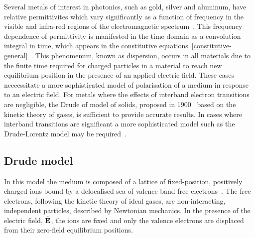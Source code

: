 Several metals of interest in photonics, such as gold, silver and aluminum, have relative permittivites which vary significantly as a function of frequency in the visible and infra-red regions of the electromagnetic spectrum~\cite{Ordal:1983bg}.
This frequency dependence of permittivity is manifested in the time domain as a convolution integral in time, which appears in the constitutive equations~\eqref{constitutive-general}~\cite{Jackson:490457}.
This phenomenum, known as dispersion, occurs in all materials due to the finite time required for charged particles in a material to reach new equilibrium position in the presence of an applied electric field.
These cases neccessitate a more sophisticated model of polarisation of a medium in response to an electric field. For metals where the effects of interband electron transitions are negligible, the Drude of model of solids, proposed in 1900~\cite{Drude:1900hg} based on the kinetic theory of gases, is sufficient to provide accurate results. In cases where interband transitions are significant a more sophisticated model such as the Drude-Lorentz model may be required~\cite{Fox:2001wm,Taflove:1989ds}.

\subsection{Drude model}
\label{sub:The Drude Model}

In this model the medium is composed of a lattice of fixed-position, positively charged ions bound by a delocalised sea of valence band free electrons~\cite{Ashcroft:2005wp,Bandyopadhyay:1503732}. The free electrons, following the kinetic theory of ideal gases, are non-interacting, independent particles, described by Newtonian mechanics. In the presence of the electric field, $\tilde{\mathbf{E}}$, the ions are fixed and only the valence electrons are displaced from their zero-field equilibrium positions.
%


